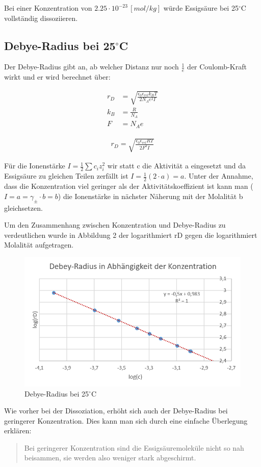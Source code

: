 Bei einer Konzentration von $2.25 \cdot 10^{-23} \, [mol/kg]$ würde Essigsäure bei 25$^\circ$C vollständig dissoziieren.

\subsection{Debye-Radius bei 25$^\circ$C}

Der Debye-Radius gibt an, ab welcher Distanz nur noch $\frac{1}{e}$ der Coulomb-Kraft wirkt und er wird berechnet über:

\begin{align*}
    r_D &= \sqrt{ \frac{\epsilon _0 \epsilon _{rel} k_B T}{2N_A e^2 I}} \\
    k_B &= \frac{R}{N_A} \\
    F &= N_A e
\end{align*}

\begin{align}
    r_D = \sqrt{ \frac{\epsilon _0 \epsilon _{rel} R T}{2 F^2 I}}
\end{align}

Für die Ionenstärke $I = \frac{1}{2} \sum c_i z_i^2$ wir statt c die Aktivität a eingesetzt und da Essigsäure zu gleichen Teilen zerfällt
ist $I = \frac{1}{2} (2 \cdot a) = a$. Unter der Annahme, dass die Konzentration  viel geringer als der Aktivitätskoeffizient ist kann man
($I = a = \gamma _\pm \cdot b = b$) die Ionenstärke in nächster Näherung mit der Molalität b gleichsetzen.

 

Um den Zusammenhang zwischen Konzentration und Debye-Radius zu verdeutlichen wurde in Abbildung 2 der logarithmiert rD gegen die logarithmiert Molalität
aufgetragen.

\begin{figure}[H]
    \centering
    \includegraphics[scale=.7]{../src/img/graph2_25C.png}
    \caption{Debye-Radius bei 25$^\circ$C}
\end{figure}

Wie vorher bei der Dissoziation, erhöht sich auch der Debye-Radius bei geringerer Konzentration. Dies kann man sich durch eine einfache 
Überlegung erklären:
\begin{quote}
    Bei geringerer Konzentration sind die Essigsäuremoleküle nicht so nah beisammen, sie werden also weniger stark abgeschirmt.
\end{quote}

